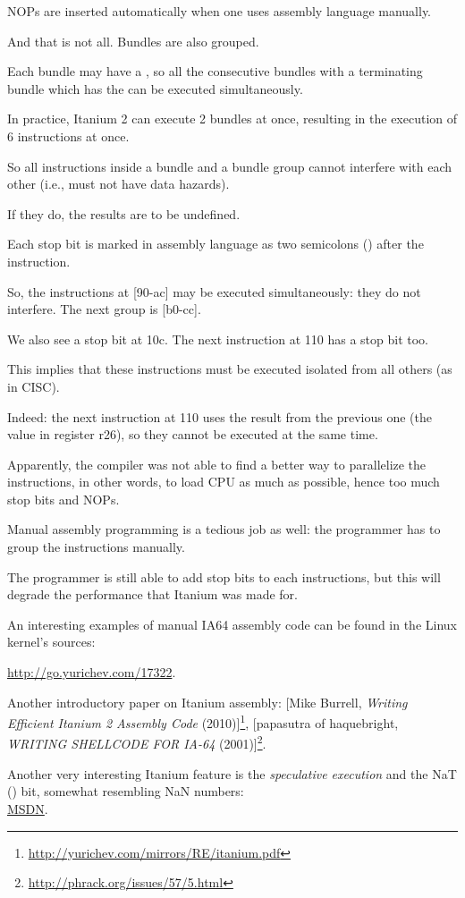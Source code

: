 \ac{NOP}s are inserted automatically when one uses assembly language manually.

And that is not all. Bundles are also grouped.

Each bundle may have a ,
so all the consecutive bundles with a terminating bundle which has the  
can be executed simultaneously.

In practice, Itanium 2 can execute 2 bundles at once, resulting in the execution of 6 instructions at once.

So all instructions inside a bundle and a bundle group cannot interfere with each other 
(i.e., must not have data hazards).

If they do, the results are to be undefined.

Each stop bit is marked in assembly language as two semicolons (\TT{;;}) after the instruction.

So, the instructions at [90-ac] may be executed simultaneously:
they do not interfere. The next group is [b0-cc].

We also see a stop bit at 10c.
The next instruction at 110 has a stop bit too.

This implies that these instructions must be executed isolated from all others (as in \ac{CISC}).

Indeed: the next instruction at 110 uses the result from the previous one (the value in register r26),
so they cannot be executed at the same time.

Apparently, the compiler was not able to find a better way to parallelize the instructions,
in other words, to load \ac{CPU} as much as possible, hence too much stop bits and \ac{NOP}s.

Manual assembly programming is a tedious job as well: the programmer has to group the instructions manually.

The programmer is still able to add stop bits to each instructions, but this will degrade
the performance that Itanium was made for.

An interesting examples of manual \ac{IA64} assembly code can be found in the Linux kernel's sources:

\url{http://go.yurichev.com/17322}.

Another introductory paper on Itanium assembly:
[Mike Burrell, \emph{Writing Efficient Itanium 2 Assembly Code} (2010)]\footnote{\AlsoAvailableAs \url{http://yurichev.com/mirrors/RE/itanium.pdf}},
[papasutra of haquebright, \emph{WRITING SHELLCODE FOR IA-64} (2001)]\footnote{\AlsoAvailableAs \url{http://phrack.org/issues/57/5.html}}.

Another very interesting Itanium feature is the \emph{speculative execution} and the NaT () bit,
somewhat resembling \gls{NaN} numbers: \\
\href{http://go.yurichev.com/17323}{MSDN}.

